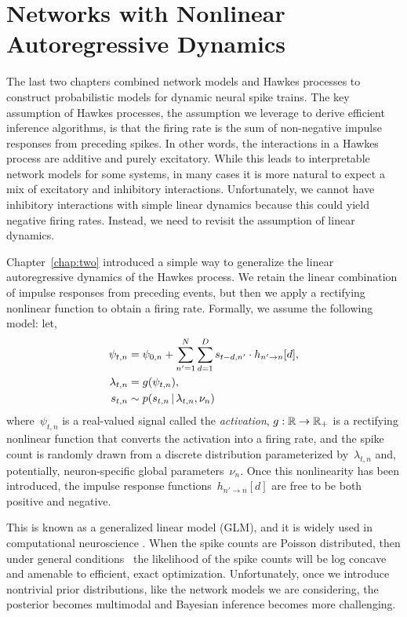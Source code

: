 
\chapter{Networks with Nonlinear Autoregressive Dynamics}
\label{chap:five}

The last two chapters combined network models and Hawkes processes to
construct probabilistic models for dynamic neural spike trains. The
key assumption of Hawkes processes, the assumption we leverage to
derive efficient inference algorithms, is that the firing rate is the
sum of non-negative impulse responses from preceding spikes. In other
words, the interactions in a Hawkes process are additive and purely
excitatory. While this leads to interpretable network models for some
systems, in many cases it is more natural to expect a mix of
excitatory and inhibitory interactions. Unfortunately, we cannot have
inhibitory interactions with simple linear dynamics because this could
yield negative firing rates. Instead, we need to revisit the
assumption of linear dynamics.

Chapter~\ref{chap:two} introduced a simple way to generalize the 
linear autoregressive dynamics of the Hawkes process. We retain the 
linear combination of impulse responses from preceding events, but then 
we apply a rectifying nonlinear function to obtain a firing rate. 
Formally, we assume the following model: let,
\begin{align*}
\psi_{t,n} &= \psi_{0,n} + \sum_{n'=1}^N \sum_{d=1}^{D} s_{t-d, n'} \cdot h_{n' \to n}[d], \\
\lambda_{t,n} &= g(\psi_{t,n}), \\
s_{t,n} &\sim p(s_{t,n} \,|\, \lambda_{t,n}, \nu_n)
\end{align*}
where~$\psi_{t,n}$ is a real-valued signal called the
\emph{activation}, ${g: \mathbb{R} \to \mathbb{R}_+}$ is a rectifying
nonlinear function that converts the activation into a firing rate,
and the spike count is randomly drawn from a discrete distribution parameterized 
by~$\lambda_{t,n}$ and, potentially, neuron-specific global parameters~$\nu_n$.
Once this nonlinearity has been introduced, the impulse response
functions~$h_{n' \to n}[d]$ are free to be both positive and negative.

This is known as a generalized 
linear model (GLM), and it is widely used in computational neuroscience 
\cite{Paninski-2004, Truccolo-2005, Pillow-2008}. When the spike counts 
are Poisson distributed, then under general conditions~\cite{Paninski-2004} 
the likelihood of the spike counts will be log concave and amenable to 
efficient, exact optimization. Unfortunately, once we introduce nontrivial
prior distributions, like the network models we are considering, 
the posterior becomes multimodal and Bayesian inference becomes more 
challenging. 

